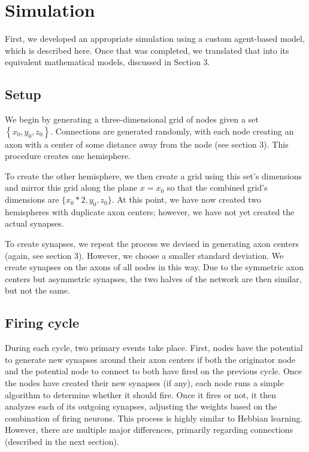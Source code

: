 \documentclass[12pt]{article}
\begin{document}
\newpage

\section{Simulation} \label{simulation}

First, we developed an appropriate simulation using a custom agent-based model, which is described here.  Once that was completed, we translated that into its equivalent mathematical models, discussed in Section 3.

\subsection{Setup} \label{setup}

We begin by generating a three-dimensional grid of nodes given a set $\left\{x_0, y_0, z_0\right\}$.  Connections are generated randomly, with each node creating an axon with a center of some distance away from the node (see section 3).  This procedure creates one hemisphere.

To create the other hemisphere, we then create a grid using this set's dimensions and mirror this grid along the plane $x = x_0$ so that the combined grid's dimensions are $\{x_0 * 2, y_0, z_0\}$.  At this point, we have now created two hemispheres with duplicate axon centers; however, we have not yet created the actual synapses.

To create synapses, we repeat the process we devised in generating axon centers (again, see section 3).  However, we choose a smaller standard deviation.  We create synapses on the axons of all nodes in this way.  Due to the symmetric axon centers but asymmetric synapses, the two halves of the network are then similar, but not the same.

\subsection{Firing cycle} \label{cycle}

During each cycle, two primary events take place.  First, nodes have the potential to generate new synapses around their axon centers if both the originator node and the potential node to connect to both have fired on the previous cycle.  Once the nodes have created their new synapses (if any), each node runs a simple algorithm to determine whether it should fire.  Once it fires or not, it then analyzes each of its outgoing synapses, adjusting the weights based on the combination of firing neurons.  This process is highly similar to Hebbian learning.  However, there are multiple major differences, primarily regarding connections (described in the next section).
\end{document}
